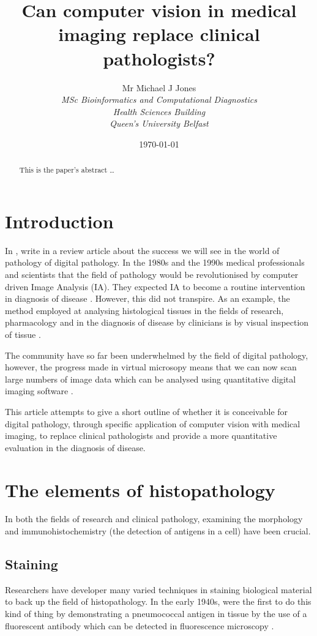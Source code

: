 \documentclass[12pt]{article}
\title{Can computer vision in medical imaging replace clinical pathologists?} %
\author{
        Mr Michael J Jones \\
                \em{MSc Bioinformatics and Computational Diagnostics}\\
       	Health Sciences Building\\
        Queen's University Belfast
}
\date{\today}
\begin{document}
\maketitle

\begin{abstract}
This is the paper's abstract \ldots
\end{abstract}

\section{Introduction}
In \citeyear{hamilton2014digital}, \citeauthor{hamilton2014digital} write in a review article about the success we 
will see in the world of pathology of digital pathology. In the 1980s and the 1990s medical professionals and scientists that the field of 
pathology would be revolutionised by computer driven Image Analysis (IA). They expected IA to become a routine intervention in diagnosis 
of disease \parencite{hamilton2014digital}. However, this did not transpire. As an example, the method employed 
at analysing histological tissues in the fields of research, pharmacology and in the diagnosis of disease by clinicians is 
by visual inspection of tissue \parencite{kriete2005automated}.

The community have so far been underwhelmed by the field of digital pathology, however, the progress made in virtual microsopy 
means that we can now scan large numbers of image data which can be analysed using quantitative digital imaging 
software \parencite{mccavigan2012digital}.

This article attempts to give a short outline of whether it is conceivable for digital pathology, through specific 
application of computer vision with medical imaging, to replace clinical pathologists and provide a more quantitative 
evaluation in the diagnosis of disease.

\section{The elements of histopathology}
In both the fields of research and clinical pathology, examining the morphology and immunohistochemistry (the detection 
of antigens in a cell) have been crucial.

\subsection{Staining}
\label{sec:staining}
Researchers have developer many varied techniques  in staining biological material to back up the 
field of histopathology. In the early 1940s, \citeauthor{coons1942demonstration} were the first to do this kind of 
thing by demonstrating a pneumococcal antigen in tissue by the use of a fluorescent antibody which can be detected in 
fluorescence microscopy \parencite{coons1942demonstration}.
\end{document}
